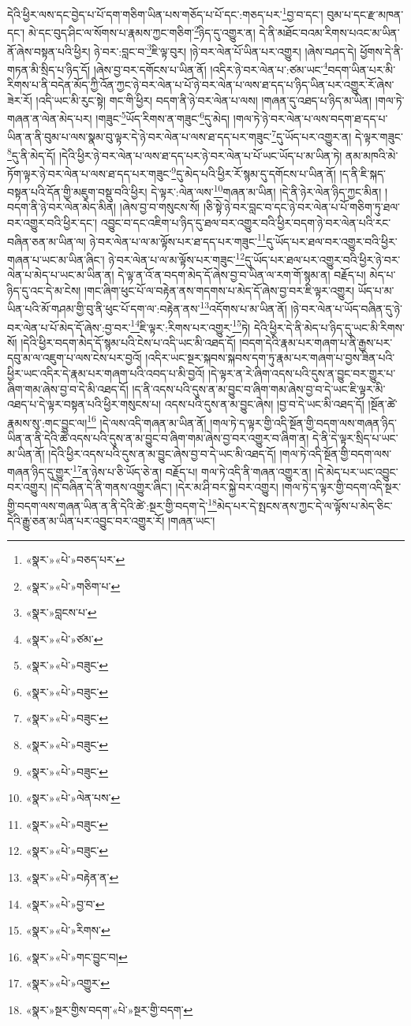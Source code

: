 དེའི་ཕྱིར་ལས་དང་བྱེད་པ་པོ་དག་གཅིག་ཡིན་པས་གཅོད་པ་པོ་དང་:གཅད་པར་\footnote{«སྣར་»«པེ་»བཅད་པར་}བྱ་བ་དང་། བུམ་པ་དང་རྫ་མཁན་དང་། མེ་དང་བུད་ཤིང་ལ་སོགས་པ་རྣམས་ཀྱང་གཅིག་\footnote{«སྣར་»«པེ་»གཅིག་པ་}ཉིད་དུ་འགྱུར་ན། དེ་ནི་མཐོང་བའམ་རིགས་པའང་མ་ཡིན་ནོ་ཞེས་བསྟན་པའི་ཕྱིར། ཉེ་བར་:བླང་བ་\footnote{«སྣར་»བླངས་པ་}ཇི་ལྟ་བུར། །ཉེ་བར་ལེན་པོ་ཡིན་པར་འགྱུར། །ཞེས་བཤད་དེ། ཕྱོགས་དེ་ནི་གཏན་མི་སྲིད་པ་ཉིད་དོ། །ཞེས་བྱ་བར་དགོངས་པ་ཡིན་ནོ། །འདིར་ཉེ་བར་ལེན་པ་:ཙམ་ཡང་\footnote{«སྣར་»«པེ་»ཙམ་}བདག་ཡིན་པར་མི་རིགས་པ་ནི་བདེན་མོད་ཀྱི་འོན་ཀྱང་ཉེ་བར་ལེན་པ་པོ་ཉེ་བར་ལེན་པ་ལས་ཐ་དད་པ་ཉིད་ཡིན་པར་འགྱུར་རོ་ཞེས་ཟེར་རོ། །འདི་ཡང་མི་རུང་སྟེ། གང་གི་ཕྱིར། བདག་ནི་ཉེ་བར་ལེན་པ་ལས། །གཞན་དུ་འཐད་པ་ཉིད་མ་ཡིན། །གལ་ཏེ་གཞན་ན་ལེན་མེད་པར། །གཟུང་\footnote{«སྣར་»«པེ་»བཟུང་}ཡོད་རིགས་ན་གཟུང་\footnote{«སྣར་»«པེ་»བཟུང་}དུ་མེད། །གལ་ཏེ་ཉེ་བར་ལེན་པ་ལས་བདག་ཐ་དད་པ་ཡིན་ན་ནི་བུམ་པ་ལས་སྣམ་བུ་ལྟར་དེ་ཉེ་བར་ལེན་པ་ལས་ཐ་དད་པར་གཟུང་\footnote{«སྣར་»«པེ་»བཟུང་}དུ་ཡོད་པར་འགྱུར་ན། དེ་ལྟར་གཟུང་\footnote{«སྣར་»«པེ་»བཟུང་}དུ་ནི་མེད་དོ། །དེའི་ཕྱིར་ཉེ་བར་ལེན་པ་ལས་ཐ་དད་པར་ཉེ་བར་ལེན་པ་པོ་ཡང་ཡོད་པ་མ་ཡིན་ཏེ། ནམ་མཁའི་མེ་ཏོག་ལྟར་ཉེ་བར་ལེན་པ་ལས་ཐ་དད་པར་གཟུང་\footnote{«སྣར་»«པེ་»བཟུང་}དུ་མེད་པའི་ཕྱིར་རོ་སྙམ་དུ་དགོངས་པ་ཡིན་ནོ། །ད་ནི་ཇི་སྐད་བསྟན་པའི་དོན་གྱི་མཇུག་བསྡུ་བའི་ཕྱིར། དེ་ལྟར་:ལེན་ལས་\footnote{«སྣར་»«པེ་»ལེན་པས་}གཞན་མ་ཡིན། །དེ་ནི་ཉེར་ལེན་ཉིད་ཀྱང་མིན། །བདག་ནི་ཉེ་བར་ལེན་མེད་མིན། །ཞེས་བྱ་བ་གསུངས་སོ། །ཅི་སྟེ་ཉེ་བར་བླང་བ་དང་ཉེ་བར་ལེན་པ་པོ་གཅིག་ཏུ་ཐལ་བར་འགྱུར་བའི་ཕྱིར་དང་། འབྱུང་བ་དང་འཇིག་པ་ཉིད་དུ་ཐལ་བར་འགྱུར་བའི་ཕྱིར་བདག་ཉེ་བར་ལེན་པའི་རང་བཞིན་ཅན་མ་ཡིན་ལ། ཉེ་བར་ལེན་པ་ལ་མ་ལྟོས་པར་ཐ་དད་པར་གཟུང་\footnote{«སྣར་»«པེ་»བཟུང་}དུ་ཡོད་པར་ཐལ་བར་འགྱུར་བའི་ཕྱིར་གཞན་པ་ཡང་མ་ཡིན་ཞིང་། ཉེ་བར་ལེན་པ་ལ་མ་ལྟོས་པར་གཟུང་\footnote{«སྣར་»«པེ་»བཟུང་}དུ་ཡོད་པར་ཐལ་པར་འགྱུར་བའི་ཕྱིར་ཉེ་བར་ལེན་པ་མེད་པ་ཡང་མ་ཡིན་ན། དེ་ལྟ་ན་འོ་ན་བདག་མེད་དོ་ཞེས་བྱ་བ་ཡིན་ལ་རག་གོ་སྙམ་ན། བརྗོད་པ། མེད་པ་ཉིད་དུ་འང་དེ་མ་ངེས། །གང་ཞིག་ཕུང་པོ་ལ་བརྟེན་ནས་གདགས་པ་མེད་དོ་ཞེས་བྱ་བར་ཇི་ལྟར་འགྱུར། ཡོད་པ་མ་ཡིན་པའི་མོ་གཤམ་གྱི་བུ་ནི་ཕུང་པོ་དག་ལ་:བརྟེན་ནས་\footnote{«སྣར་»«པེ་»བརྟེན་ན་}འདོགས་པ་མ་ཡིན་ནོ། །ཉེ་བར་ལེན་པ་ཡོད་བཞིན་དུ་ཉེ་བར་ལེན་པ་པོ་མེད་དོ་ཞེས་:བྱ་བར་\footnote{«སྣར་»«པེ་»བྱ་བ་}ཇི་ལྟར་:རིགས་པར་འགྱུར་\footnote{«སྣར་»«པེ་»རིགས་}ཏེ། དེའི་ཕྱིར་དེ་ནི་མེད་པ་ཉིད་དུ་ཡང་མི་རིགས་སོ། །དེའི་ཕྱིར་བདག་མེད་དོ་སྙམ་པའི་ངེས་པ་འདི་ཡང་མི་འཐད་དོ། །བདག་དེའི་རྣམ་པར་གཞག་པ་ནི་རྒྱས་པར་དབུ་མ་ལ་འཇུག་པ་ལས་ངེས་པར་བྱའོ། །འདིར་ཡང་སྔར་སྐབས་སྐབས་དག་ཏུ་རྣམ་པར་གཞག་པ་བྱས་ཟིན་པའི་ཕྱིར་ཡང་འདིར་དེ་རྣམ་པར་གཞག་པའི་འབད་པ་མི་བྱའོ། །དེ་ལྟར་ན་རེ་ཞིག་འདས་པའི་དུས་ན་བྱུང་བར་གྱུར་པ་ཞིག་གམ་ཞེས་བྱ་བ་དེ་མི་འཐད་དོ། །ད་ནི་འདས་པའི་དུས་ན་མ་བྱུང་བ་ཞིག་གམ་ཞེས་བྱ་བ་དེ་ཡང་ཇི་ལྟར་མི་འཐད་པ་དེ་ལྟར་བསྟན་པའི་ཕྱིར་གསུངས་པ། འདས་པའི་དུས་ན་མ་བྱུང་ཞེས། །བྱ་བ་དེ་ཡང་མི་འཐད་དོ། །སྔོན་ཚེ་རྣམས་སུ་:གང་བྱུང་ལ།\footnote{«སྣར་»«པེ་»གང་བྱུང་བ།} །དེ་ལས་འདི་གཞན་མ་ཡིན་ནོ། །གལ་ཏེ་ད་ལྟར་གྱི་འདི་སྔོན་གྱི་བདག་ལས་གཞན་ཉིད་ཡིན་ན་ནི་དེའི་ཚེ་འདས་པའི་དུས་ན་མ་བྱུང་བ་ཞིག་གམ་ཞེས་བྱ་བར་འགྱུར་བ་ཞིག་ན། དེ་ནི་དེ་ལྟར་སྲིད་པ་ཡང་མ་ཡིན་ནོ། །དེའི་ཕྱིར་འདས་པའི་དུས་ན་མ་བྱུང་ཞེས་བྱ་བ་དེ་ཡང་མི་འཐད་དོ། །གལ་ཏེ་འདི་སྔོན་གྱི་བདག་ལས་གཞན་ཉིད་དུ་གྱུར་\footnote{«སྣར་»«པེ་»འགྱུར་}ན་ཉེས་པ་ཅི་ཡོད་ཅེ་ན། བརྗོད་པ། གལ་ཏེ་འདི་ནི་གཞན་འགྱུར་ན། །དེ་མེད་པར་ཡང་འབྱུང་བར་འགྱུར། །དེ་བཞིན་དེ་ནི་གནས་འགྱུར་ཞིང་། །དེར་མ་ཤི་བར་སྐྱེ་བར་འགྱུར། །གལ་ཏེ་ད་ལྟར་གྱི་བདག་འདི་སྔར་གྱི་བདག་ལས་གཞན་ཡིན་ན་ནི་དེའི་ཚེ་:སྔར་གྱི་བདག་དེ་\footnote{«སྣར་»སྔར་གྱིས་བདག་«པེ་»སྔར་གྱི་བདག་}མེད་པར་དེ་སྤངས་ནས་ཀྱང་དེ་ལ་ལྟོས་པ་མེད་ཅིང་དེའི་རྒྱུ་ཅན་མ་ཡིན་པར་འབྱུང་བར་འགྱུར་རོ། །གཞན་ཡང་། 